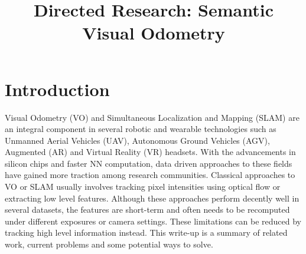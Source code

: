 \documentclass[conference]{IEEEtran}
\begin{document}
%
\title{Directed Research: Semantic Visual Odometry}


\author{
	}







\maketitle

\section{Introduction}

Visual Odometry (VO) and Simultaneous Localization and Mapping (SLAM) are an integral component in several robotic and wearable technologies such as Unmanned Aerial Vehicles (UAV), Autonomous Ground Vehicles (AGV), Augmented (AR) and Virtual Reality (VR) headsets. With the advancements in silicon chips and faster NN computation, data driven approaches to these fields have gained more traction among research communities. Classical approaches to VO or SLAM usually involves tracking pixel intensities using optical flow or extracting low level features. Although these approaches perform decently well in several datasets, the features are short-term and often needs to be recomputed under different exposures or camera settings. These limitations can be reduced by tracking high level information instead. This write-up is a summary of related work, current problems and some potential ways to solve.
\end{document}
